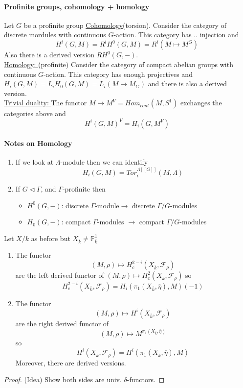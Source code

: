 \paragraph{Profinite groups, cohomology + homology} Let $G$ be a profinite group \underline{Cohomology}(torsion). Consider the category of discrete mordules with continuous $G$-action. This category has .. injection and 
	$$H^i(G, M) = R^iH^0(G, M) = R^i(M\mapsto M^G)$$
	Also there is a derived version $RH^0(G, -)$. \\

\noindent\underline{Homology: }(profinite) Consider the category of compact abelian groups with continuous $G$-action. This category has enough projectives and $H_i(G, M) = L_iH_0(G, M)=L_i(M\mapsto M_G)$ and there is also a derived version. 
\\

\noindent
\underline{Trivial duality: } The functor $M\mapsto  M^V = Hom_{cont}(M, S^1)$	 exchanges the categories above and
	$$ H^i(G, M)^V = H_i(G, M^V)$$
	
\paragraph{Notes on Homology} \begin{enumerate}
	\item If we look at $\Lambda$-module then we can identify
		$$H_i(G, M)=Tor_i^{\Lambda[[G]]}(M, \Lambda)$$
		
	\item If $G\vartriangleleft \Gamma$, and $\Gamma$-profinite then
		\begin{itemize}
		\item $H^0(G, -)$: discrete $\Gamma$-module$\to$ discrete $\Gamma/G$-modules
		\item $H_0(G, -)$: compact $\Gamma$-modules $\to$ compact $\Gamma/G$-modules
		\end{itemize}
	\end{enumerate}
	
\begin{proposition} Let $X/k$ as before but $X_{\overline k}\neq \mathbb P^1_{\overline k}$ 
\begin{enumerate}
	\item The functor
		$$(M, \rho)\mapsto H_c^{2-i}(X_{\overline k}, \mathcal{F}_\rho)$$
		are the left derived functor of $(M, \rho)\mapsto H_c^2(X_{\overline k}, \mathcal{F}_\rho)$ so
			$$H_c^{2-i}(X_{\overline k},\mathcal{F}_\rho) = H_i(\pi_1(X_{\overline k}, \overline \eta), M)(-1)$$
			
	\item The functor
		$$(M, \rho)\mapsto H^i(X_{\overline k}, \mathcal{F}_\rho)$$
		are the right derived functor of 
		$$(M, \rho)\mapsto M^{\pi_1(X_{\overline k}, \overline \eta)}$$
		so 
		$$H^i(X_{\overline k}, \mathcal{F}_\rho) = H^i(\pi_1(X_{\overline k}, \overline \eta), M)$$
		Moreover, there are derived versions. 
\end{enumerate}
\end{proposition}
\begin{proof}(Idea) Show both sides are univ. $\delta$-functors.
\end{proof}

